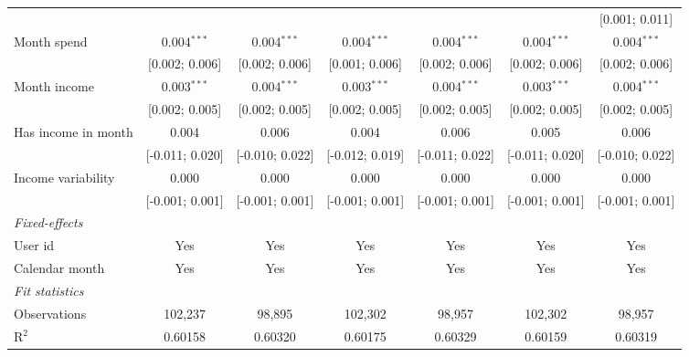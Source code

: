 \begin{table}[htbp]
\begin{threeparttable}[b]
\begin{tabular}{lcccccc}
                                         &                 &                 &                 &                 &                 & [0.001; 0.011]\\   
         Month spend                     & 0.004$^{***}$   & 0.004$^{***}$   & 0.004$^{***}$   & 0.004$^{***}$   & 0.004$^{***}$   & 0.004$^{***}$\\   
                                         & [0.002; 0.006]  & [0.002; 0.006]  & [0.001; 0.006]  & [0.002; 0.006]  & [0.002; 0.006]  & [0.002; 0.006]\\   
         Month income                    & 0.003$^{***}$   & 0.004$^{***}$   & 0.003$^{***}$   & 0.004$^{***}$   & 0.003$^{***}$   & 0.004$^{***}$\\   
                                         & [0.002; 0.005]  & [0.002; 0.005]  & [0.002; 0.005]  & [0.002; 0.005]  & [0.002; 0.005]  & [0.002; 0.005]\\   
         Has income in month             & 0.004           & 0.006           & 0.004           & 0.006           & 0.005           & 0.006\\   
                                         & [-0.011; 0.020] & [-0.010; 0.022] & [-0.012; 0.019] & [-0.011; 0.022] & [-0.011; 0.020] & [-0.010; 0.022]\\   
         Income variability              & 0.000           & 0.000           & 0.000           & 0.000           & 0.000           & 0.000\\   
                                         & [-0.001; 0.001] & [-0.001; 0.001] & [-0.001; 0.001] & [-0.001; 0.001] & [-0.001; 0.001] & [-0.001; 0.001]\\   
         \midrule
         \emph{Fixed-effects}\\
         User id                         & Yes             & Yes             & Yes             & Yes             & Yes             & Yes\\  
         Calendar month                  & Yes             & Yes             & Yes             & Yes             & Yes             & Yes\\  
         \midrule
         \emph{Fit statistics}\\
         Observations                    & 102,237         & 98,895          & 102,302         & 98,957          & 102,302         & 98,957\\  
         R$^2$                           & 0.60158         & 0.60320         & 0.60175         & 0.60329         & 0.60159         & 0.60319\\  

\end{tabular}
\end{threeparttable}
\end{table}
